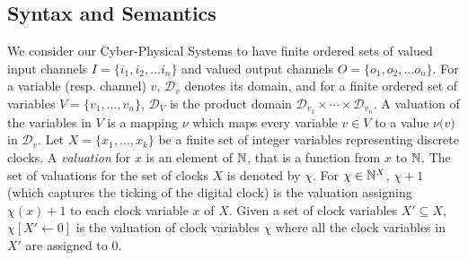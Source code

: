 

	
	

\subsection{Syntax and Semantics}
We consider our Cyber-Physical Systems to have finite ordered sets of valued input channels ${I} = \{{i_1}, {i_2}, \ldots {i_n}\}$ and valued output channels ${O} = \{{o_1}, {o_2}, \ldots {o_n}\}$.
%
For a variable (resp. channel) $v$, ${\mathcal D}_v$ denotes its domain,
and for a finite ordered set of variables $V= \{v_1, \ldots, v_n \big\}$,
${\mathcal D}_V$ is the product domain ${\mathcal D}_{v_1} \times \cdots \times {\mathcal D}_{v_n}$.
A valuation of the variables in $V$
is a mapping $\nu$ which maps every variable $v \in V$ to a value $\nu\big(v\big)$ in ${\mathcal D}_v$.
%
Let $X=\{x_1,\ldots, x_k\}$ be a finite set of integer variables representing discrete clocks.
%
A {\em valuation} for $x$ is an element of $\mathbb{N}$, that is a function from $x$ to $\mathbb{N}$.
The set of valuations for the set of clocks $X$ is denoted by $\chi$.
%
For $\chi\in\mathbb{N}^X$, $\chi+1$ (which captures the ticking of the digital clock) is the valuation assigning $\chi\left(x\right)+1$ to each clock variable $x$ of $X$.
Given a set of clock variables $X' \subseteq X$, $\chi\left[X' \leftarrow 0\right]$ is the valuation of clock variables $\chi$ where all the clock variables in $X'$ are assigned to $0$.


